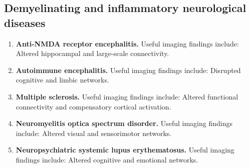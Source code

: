 \subsection{Demyelinating and inflammatory neurological diseases}
\begin{enumerate}[leftmargin=*,itemsep=0.45em,topsep=0.4em]
\item \textbf{Anti-NMDA receptor encephalitis.} Useful imaging findings include: Altered hippocampal and large-scale connectivity.
\item \textbf{Autoimmune encephalitis.} Useful imaging findings include: Disrupted cognitive and limbic networks.
\item \textbf{Multiple sclerosis.} Useful imaging findings include: Altered functional connectivity and compensatory cortical activation.
\item \textbf{Neuromyelitis optica spectrum disorder.} Useful imaging findings include: Altered visual and sensorimotor networks.
\item \textbf{Neuropsychiatric systemic lupus erythematosus.} Useful imaging findings include: Altered cognitive and emotional networks.
\end{enumerate}

